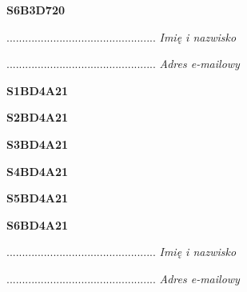 \begin{turn}{90}\huge \textbf{S6B3D720}\end{turn}

\begin{turn}{90}\begin{minipage}{\linewidth} \vspace{20mm} ................................................  \textit{Imię i nazwisko}\end{minipage}\end{turn}

\begin{turn}{90}\begin{minipage}{\linewidth} \vspace{20mm} ................................................  \textit{Adres e-mailowy}\end{minipage}\end{turn}

\begin{turn}{90}\huge \textbf{S1BD4A21}\end{turn}

\begin{turn}{90}\huge \textbf{S2BD4A21}\end{turn}

\begin{turn}{90}\huge \textbf{S3BD4A21}\end{turn}

\begin{turn}{90}\huge \textbf{S4BD4A21}\end{turn}

\begin{turn}{90}\huge \textbf{S5BD4A21}\end{turn}

\begin{turn}{90}\huge \textbf{S6BD4A21}\end{turn}

\begin{turn}{90}\begin{minipage}{\linewidth} \vspace{20mm} ................................................  \textit{Imię i nazwisko}\end{minipage}\end{turn}

\begin{turn}{90}\begin{minipage}{\linewidth} \vspace{20mm} ................................................  \textit{Adres e-mailowy}\end{minipage}\end{turn}

